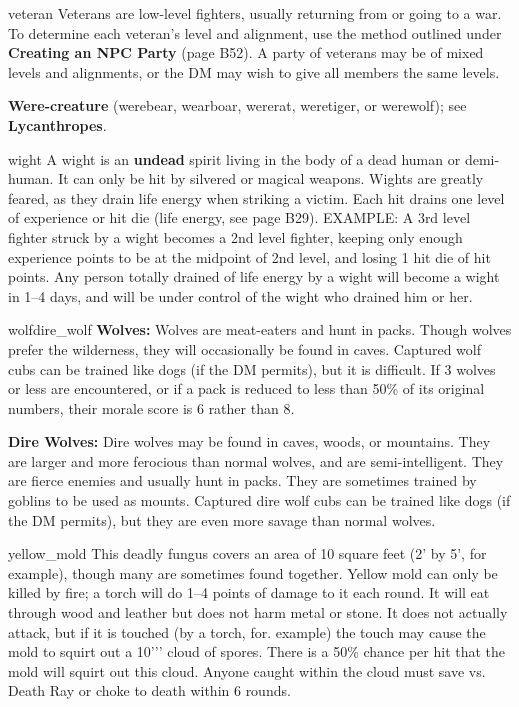 \documentclass[letterpaper,serif,tightsqueeze]{rpg-module}
\begin{document}
\begin{newmonster}{veteran}
Veterans are low-level fighters, usually returning from or going to a
war. To determine each veteran's level and alignment, use the
method outlined under \textbf{Creating an NPC Party} (page B52). A
party of veterans may be of mixed levels and alignments, or the
DM may wish to give all members the same levels.
\end{newmonster}
\textbf{Were-creature} (werebear, wearboar, wererat, weretiger, or werewolf); see \textbf{Lycanthropes}.\\[1ex]
\begin{newmonster}{wight}
A wight is an \textbf{undead} spirit living in the body of a dead human or
demi-human. It can only be hit by silvered or magical weapons.
Wights are greatly feared, as they drain life energy when striking a
victim. Each hit drains one level of experience or hit die (life
energy, see page B29). EXAMPLE: A 3rd level fighter struck by a
wight becomes a 2nd level fighter, keeping only enough experience
points to be at the midpoint of 2nd level, and losing 1 hit die
of hit points. Any person totally drained of life energy by a wight
will become a wight in 1--4 days, and will be under control of the
wight who drained him or her.
\end{newmonster}
\begin{newmonster2}{wolf}{dire_wolf}
\textbf{Wolves:} Wolves are meat-eaters and hunt in packs. Though
wolves prefer the wilderness, they will occasionally be found in
caves. Captured wolf cubs can be trained like dogs (if the DM permits),
but it is difficult. If 3 wolves or less are encountered, or if a
pack is reduced to less than 50\% of its original numbers, their
morale score is 6 rather than 8.

\textbf{Dire Wolves:} Dire wolves may be found in caves, woods, or
mountains. They are larger and more ferocious than normal
wolves, and are semi-intelligent. They are fierce enemies and
usually hunt in packs. They are sometimes trained by goblins to be
used as mounts. Captured dire wolf cubs can be trained like dogs
(if the DM permits), but they are even more savage than normal
wolves.
\end{newmonster2}
\begin{newmonster}{yellow_mold}
This deadly fungus covers an area of 10 square feet (2' by 5', for
example), though many are sometimes found together. Yellow
mold can only be killed by fire; a torch will do 1--4 points of damage
to it each round. It will eat through wood and leather but does not
harm metal or stone. It does not actually attack, but if it is touched
(by a torch, for. example) the touch may cause the mold to squirt
out a 10''' cloud of spores. There is a 50\% chance per hit
that the mold will squirt out this cloud. Anyone caught within the
cloud must save vs. Death Ray or choke to death within 6 rounds.
\end{newmonster}
\end{document}
